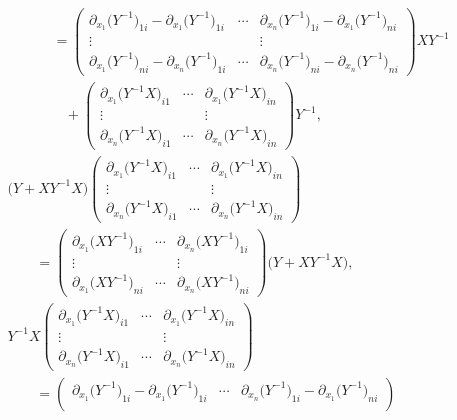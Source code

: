 \documentclass[pdftex]{sigma}
\numberwithin{equation}{section}
\begin{document}
\begin{align}
&\phantom{\qquad-}{}=
\begin{pmatrix}
\partial_{x_1}\bigl(Y^{-1}\bigr)_{1i}-\partial_{x_1}\bigl(Y^{-1}\bigr)_{1i} & \cdots & \partial_{x_n}\bigl(Y^{-1}\bigr)_{1i}-\partial_{x_1}\bigl(Y^{-1}\bigr)_{ni} \\
\vdots & & \vdots \\
\partial_{x_1}\bigl(Y^{-1}\bigr)_{ni}-\partial_{x_n}\bigl(Y^{-1}\bigr)_{1i} & \cdots & \partial_{x_n}\bigl(Y^{-1}\bigr)_{ni}-\partial_{x_n}\bigl(Y^{-1}\bigr)_{ni}
\end{pmatrix}
XY^{-1}\nonumber \\
&\phantom{\qquad-=}{}+
\begin{pmatrix}
\partial_{x_1}\bigl(Y^{-1}X\bigr)_{i1} & \cdots & \partial_{x_1}\bigl(Y^{-1}X\bigr)_{in} \\
\vdots & & \vdots \\
\partial_{x_n}\bigl(Y^{-1}X\bigr)_{i1} & \cdots & \partial_{x_n}\bigl(Y^{-1}X\bigr)_{in}
\end{pmatrix}
Y^{-1},\label{K2}
\\
& \bigl(Y+XY^{-1}X\bigr)
\begin{pmatrix}
\partial_{x_1}\bigl(Y^{-1}X\bigr)_{i1} & \cdots & \partial_{x_1}\bigl(Y^{-1}X\bigr)_{in} \\
\vdots & & \vdots \\
\partial_{x_n}\bigl(Y^{-1}X\bigr)_{i1} & \cdots & \partial_{x_n}\bigl(Y^{-1}X\bigr)_{in}
\end{pmatrix}\nonumber \\
&\qquad=
\begin{pmatrix}
\partial_{x_1}\bigl(XY^{-1}\bigr)_{1i} & \cdots & \partial_{x_n}\bigl(XY^{-1}\bigr)_{1i} \\
\vdots & & \vdots \\
\partial_{x_1}\bigl(XY^{-1}\bigr)_{ni} & \cdots & \partial_{x_n}\bigl(XY^{-1}\bigr)_{ni}
\end{pmatrix}
\bigl(Y+XY^{-1}X\bigr), \label{K3}
\\
& Y^{-1}X
\begin{pmatrix}
\partial_{x_1}\bigl(Y^{-1}X\bigr)_{i1} & \cdots & \partial_{x_1}\bigl(Y^{-1}X\bigr)_{in} \\
\vdots & & \vdots \\
\partial_{x_n}\bigl(Y^{-1}X\bigr)_{i1} & \cdots & \partial_{x_n}\bigl(Y^{-1}X\bigr)_{in}
\end{pmatrix}\nonumber \\
&\qquad=
\begin{pmatrix}
\partial_{x_1}\bigl(Y^{-1}\bigr)_{1i}-\partial_{x_1}\bigl(Y^{-1}\bigr)_{1i} & \cdots & \partial_{x_n}\bigl(Y^{-1}\bigr)_{1i}-\partial_{x_1}\bigl(Y^{-1}\bigr)_{ni} \\

\end{pmatrix}
\end{align}
\end{document}

